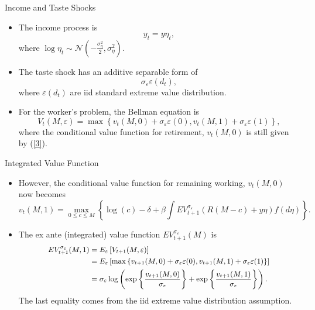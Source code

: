 \documentclass[aspectratio=169]{beamer}
\begin{document}
\begin{frame}{Income and Taste Shocks}

	\begin{itemize}
		\item The income process is $$ y_t = y \eta_t, $$where $\log \eta_t \sim \mathcal{N} (-\frac{\sigma_{\eta}^2}{2}, \sigma_{\eta}^2)$.
		\item The taste shock has an additive separable form of $$\sigma_{\varepsilon} \varepsilon(d_t), $$ where $\varepsilon(d_t)$ are iid standard extreme value distribution.
		\item For the worker's problem, the Bellman equation is 
			\begin{equation}
				\label{12}
				V_t(M, \varepsilon)=\max \left\{v_t(M, 0)+\sigma_{\varepsilon} \varepsilon(0), v_t(M, 1)+\sigma_{\varepsilon} \varepsilon(1)\right\},
			\end{equation}
		where the conditional value function for retirement, $v_t(M,0)$ is still given by (\ref{3}).
	\end{itemize}
\end{frame}

\begin{frame}{Integrated Value Function}
	\begin{itemize}
		\item  However, the conditional value function for remaining working, $v_t(M,0)$ now becomes
			\begin{equation}
				\label{13}
				v_t(M, 1)=\max _{0 \leq c \leq M}\left\{\log (c)-\delta+\beta \int E V_{t+1}^{\sigma_{\varepsilon}}(R(M-c)+y \eta) f(d \eta)\right\}.
			\end{equation}
		\item The ex ante (integrated) value function $E V_{t+1}^{\sigma_{\varepsilon}}(M)$ is 
			\begin{equation}\small
				\label{14}
				\begin{aligned}
					E V_{t+1}^{\sigma_{\varepsilon}}(M, 1) & = E_{\varepsilon} \left[ V_{t+1} (M, \varepsilon) \right] \\
					& = E_{\varepsilon} \left[\max \left\{v_{t+1}(M, 0)+\sigma_{\varepsilon} \varepsilon(0), v_{t+1}(M, 1)+\sigma_{\varepsilon} \varepsilon(1)\right\}\right] \\
					& =\sigma_{\varepsilon} \log \left(\exp \left\{\frac{v_{t+1}(M, 0)}{\sigma_{\varepsilon}}  \right\}+\exp \left\{\frac{v_{t+1}(M, 1)}{\sigma_{\varepsilon}}\right\}\right) .
				\end{aligned}
			\end{equation}
	The last equality comes from the iid extreme value distribution assumption.
	\end{itemize}
	
\end{frame}
\end{document}
